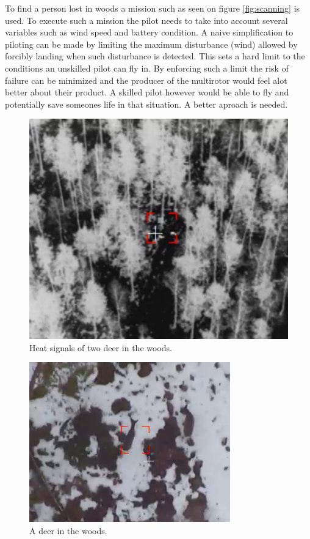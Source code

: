 \documentclass[12pt,oneside]{reedthesis}
\theoremstyle{definition}
\theoremstyle{definition}
\theoremstyle{definition}
\theoremstyle{remark}
\begin{document}
To find a person lost in woods a mission such as seen on figure
\ref{fig:scanning} is used. To execute such a mission the pilot needs to
take into account several variables such as wind speed and battery
condition. A naive simplification to piloting can be made by limiting
the maximum disturbance (wind) allowed by forcibly landing when such
disturbance is detected. This sets a hard limit to the conditions an
unskilled pilot can fly in. By enforcing such a limit the risk of
failure can be minimized and the producer of the multirotor would feel
alot better about their product. A skilled pilot however would be able
to fly and potentially save someones life in that situation. A better
aproach is needed.
\begin{figure}
\centering
\includegraphics{./figure/twoDeer.PNG}
\caption[\label{fig:twoDeer}Heat signals of two deer in the
woods.]{\label{fig:twoDeer}Heat signals of two deer in the
woods.\footnotemark{}}
\end{figure}
\begin{figure}
\centering
\includegraphics{./figure/deer.PNG}
\caption[\label{fig:deer}A deer in the woods.]{\label{fig:deer}A deer in the
woods.\footnotemark{}}
\end{figure}
\end{document}
